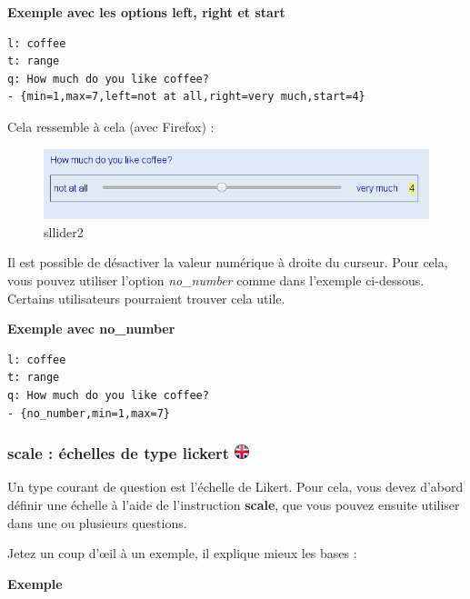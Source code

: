 \documentclass[
]{book}
\begin{document}
\textbf{Exemple avec les options left, right et start}

\begin{verbatim}
l: coffee
t: range
q: How much do you like coffee?
- {min=1,max=7,left=not at all,right=very much,start=4}
\end{verbatim}

Cela ressemble à cela (avec Firefox) :

\begin{figure}
\centering
\includegraphics{img/slider2.png}
\caption{sllider2}
\end{figure}

Il est possible de désactiver la valeur numérique à droite du curseur.
Pour cela, vous pouvez utiliser l'option \emph{no\_number} comme dans
l'exemple ci-dessous. Certains utilisateurs pourraient trouver cela
utile.

\textbf{Exemple avec no\_number}

\begin{verbatim}
l: coffee
t: range
q: How much do you like coffee?
- {no_number,min=1,max=7}
\end{verbatim}

\hypertarget{scale-uxe9chelles-de-type-lickert-ukflag}{%
\subsubsection[scale : échelles de type lickert ]{\texorpdfstring{scale
: échelles de type lickert
\href{https://www.psytoolkit.org/doc3.2.0/online-survey-syntax.html\#scales}{\protect\includegraphics{img/ukflag.png}}}{scale : échelles de type lickert ukflag}}\label{scale-uxe9chelles-de-type-lickert-ukflag}}

Un type courant de question est l'échelle de Likert. Pour cela, vous
devez d'abord définir une échelle à l'aide de l'instruction
\textbf{scale}, que vous pouvez ensuite utiliser dans une ou plusieurs
questions.

Jetez un coup d'œil à un exemple, il explique mieux les bases :

\textbf{Exemple}
\end{document}
